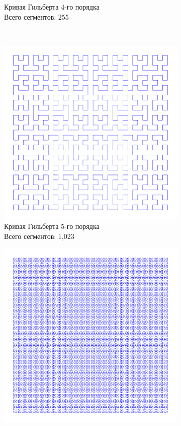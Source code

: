 \begin{figure}[H]
\begin{subfigure}{0.42\textwidth}
        \caption{Кривая Гильберта 4-го порядка \\ Всего сегментов: 255}
    \end{subfigure}
    \\
    \begin{subfigure}{0.42\textwidth}
        \includegraphics[width=\textwidth]{plots/hilbert_curve_level5.png}
        \caption{Кривая Гильберта 5-го порядка \\ Всего сегментов: 1,023}
    \end{subfigure}
    \hfill
    \begin{subfigure}{0.42\textwidth}
        \includegraphics[width=\textwidth]{plots/hilbert_curve_level7.png}

\end{subfigure}
\end{figure}
